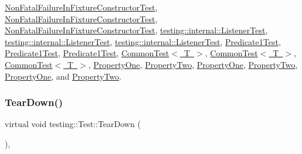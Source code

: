 \mbox{\hyperlink{class_non_fatal_failure_in_fixture_constructor_test_ab76d79c346d9a378d625fde5739e8ad6}{Non\+Fatal\+Failure\+In\+Fixture\+Constructor\+Test}}, \mbox{\hyperlink{class_non_fatal_failure_in_fixture_constructor_test_ad5d87bdc012dc66c008e7891008eb6a8}{Non\+Fatal\+Failure\+In\+Fixture\+Constructor\+Test}}, \mbox{\hyperlink{class_non_fatal_failure_in_fixture_constructor_test_ad5d87bdc012dc66c008e7891008eb6a8}{Non\+Fatal\+Failure\+In\+Fixture\+Constructor\+Test}}, \mbox{\hyperlink{classtesting_1_1internal_1_1_listener_test_a733f61300772e432a6a3ec7837c9f331}{testing\+::internal\+::\+Listener\+Test}}, \mbox{\hyperlink{classtesting_1_1internal_1_1_listener_test_a733f61300772e432a6a3ec7837c9f331}{testing\+::internal\+::\+Listener\+Test}}, \mbox{\hyperlink{classtesting_1_1internal_1_1_listener_test_ad112535025d668e3ea14e71d8741c810}{testing\+::internal\+::\+Listener\+Test}}, \mbox{\hyperlink{class_predicate1_test_aacedc6281afabd551ae2e67777016f3d}{Predicate1\+Test}}, \mbox{\hyperlink{class_predicate1_test_aacedc6281afabd551ae2e67777016f3d}{Predicate1\+Test}}, \mbox{\hyperlink{class_predicate1_test_ad2974af5c6abc508847c3a9912b24a90}{Predicate1\+Test}}, \mbox{\hyperlink{class_common_test_a5e851b64ff1f73cb79b4dbd1d39fd075}{Common\+Test$<$ T $>$}}, \mbox{\hyperlink{class_common_test_a5e851b64ff1f73cb79b4dbd1d39fd075}{Common\+Test$<$ T $>$}}, \mbox{\hyperlink{class_common_test_aeae195c2cefa956c6ae5be1226e6ecd8}{Common\+Test$<$ T $>$}}, \mbox{\hyperlink{class_property_one_a3ed895113848403d5ea27f52a1bb0545}{Property\+One}}, \mbox{\hyperlink{class_property_two_aa4ffb2b9dddeba69f0f9baf133f06ef2}{Property\+Two}}, \mbox{\hyperlink{class_property_one_a0a9a054682c28e32d6b3007e966a1aaf}{Property\+One}}, \mbox{\hyperlink{class_property_two_a8c2b36ef29249c5654f13bf8f504236a}{Property\+Two}}, \mbox{\hyperlink{class_property_one_a0a9a054682c28e32d6b3007e966a1aaf}{Property\+One}}, and \mbox{\hyperlink{class_property_two_a8c2b36ef29249c5654f13bf8f504236a}{Property\+Two}}.

\mbox{\label{classtesting_1_1_test_aab3c02c9f81afe1357adfc45afccd474}} 
\subsubsection{\texorpdfstring{TearDown()}{TearDown()}\hspace{0.1cm}{\footnotesize\ttfamily [3/3]}}
{\footnotesize\ttfamily virtual void testing\+::\+Test\+::\+Tear\+Down (\begin{DoxyParamCaption}{ }\end{DoxyParamCaption})\hspace{0.3cm}{\ttfamily [protected]}, {\ttfamily [virtual]}}



